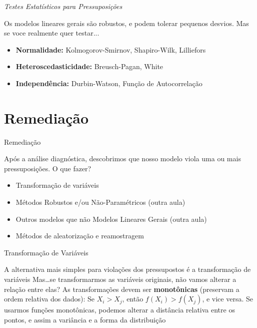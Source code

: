 \documentclass{beamer}\usepackage[]{graphicx}\usepackage[]{color}
\begin{document}
\begin{frame}{\emph{Testes Estatísticos para Pressuposições}}

Os modelos lineares gerais são robustos, e podem tolerar pequenos desvios. Mas se voce realmente quer testar...\pause
\vfill
\begin{itemize}
\item \textbf{Normalidade:} Kolmogorov-Smirnov, Shapiro-Wilk, Lilliefors
\vfill
\item \textbf{Heteroscedasticidade:} Breusch-Pagan, White
\vfill
\item \textbf{Independência:} Durbin-Watson, Função de Autocorrelação
\vfill
\end{itemize}
\end{frame}

\section{Remediação}


\begin{frame}{Remediação}

Após a análise diagnóstica, descobrimos que nosso modelo viola uma ou mais pressuposições. O que fazer? \pause
\vfill
\begin{itemize}
  \item Transformação de variáveis \pause
  \vfill
  \item Métodos Robustos e/ou Não-Paramétricos (outra aula)\pause
  \vfill
  \item Outros modelos que não Modelos Lineares Gerais (outra aula)\pause
  \vfill
  \item Métodos de aleatorização e reamostragem 
\end{itemize}
  
\end{frame}


\begin{frame}{Transformação de Variáveis}

A alternativa mais simples para violações dos pressupostos é a transformação de variáveis \pause
\vfill
Mas\ldots se transformarmos as variáveis originais, não vamos alterar a relação entre elas? \pause
\vfill
As transformações devem ser \textbf{monotônicas} (preservam a ordem relativa dos dados): Se $ X_i > X_j$, então $f(X_i) > f(X_j)$, e vice versa. \pause
\vfill
Se usarmos funções monotônicas, podemos alterar a distância relativa entre os pontos, e assim a variância e a forma da distribuição 
  
\end{frame}
\end{document}
